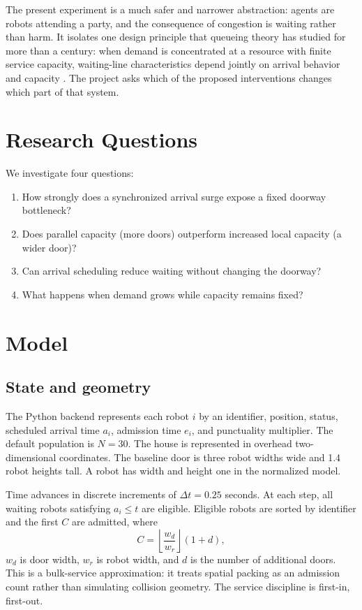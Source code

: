 \documentclass[11pt]{article}
\begin{document}
The present experiment is a much safer and narrower abstraction: agents are robots attending a party, and the consequence of congestion is waiting rather than harm. It isolates one design principle that queueing theory has studied for more than a century: when demand is concentrated at a resource with finite service capacity, waiting-line characteristics depend jointly on arrival behavior and capacity \cite{kendall1953,gross1998}. The project asks which of the proposed interventions changes which part of that system.

\section{Research Questions}
We investigate four questions:
\begin{enumerate}[leftmargin=*]
\item How strongly does a synchronized arrival surge expose a fixed doorway bottleneck?
\item Does parallel capacity (more doors) outperform increased local capacity (a wider door)?
\item Can arrival scheduling reduce waiting without changing the doorway?
\item What happens when demand grows while capacity remains fixed?
\end{enumerate}

\section{Model}
\subsection{State and geometry}
The Python backend represents each robot $i$ by an identifier, position, status, scheduled arrival time $a_i$, admission time $e_i$, and punctuality multiplier. The default population is $N=30$. The house is represented in overhead two-dimensional coordinates. The baseline door is three robot widths wide and 1.4 robot heights tall. A robot has width and height one in the normalized model.

Time advances in discrete increments of $\Delta t=0.25$ seconds. At each step, all waiting robots satisfying $a_i\leq t$ are eligible. Eligible robots are sorted by identifier and the first $C$ are admitted, where
\begin{equation}
 C = \left\lfloor \frac{w_d}{w_r} \right\rfloor (1+d),
\end{equation}
$w_d$ is door width, $w_r$ is robot width, and $d$ is the number of additional doors. This is a bulk-service approximation: it treats spatial packing as an admission count rather than simulating collision geometry. The service discipline is first-in, first-out.
\end{document}
